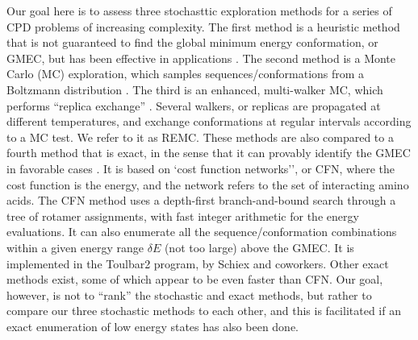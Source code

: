 Our goal here is to assess three stochasttic exploration methods for a series of CPD problems of increasing complexity.
The first method is a heuristic method that is not guaranteed to find the global minimum energy conformation, or GMEC,
but has been effective in applications \cite{Wernisch00,Schmidt09,Schmidt10}. The second method is a Monte Carlo (MC)
exploration, which samples sequences/conformations from a Boltzmann distribution \cite{Metropolis53,FrenkelBK,GrimmetBK}.
The third is an enhanced, multi-walker MC, which performs ``replica exchange'' \cite{Sugita99,Kofke02,Earl05}. Several
walkers, or replicas are propagated at different temperatures, and exchange conformations at regular intervals according
to a MC test. We refer to it as REMC. These methods are also compared to a fourth method that is exact, in the sense that
it can provably identify the GMEC in favorable cases \cite{Traore13,Allouche14}. It is based on `cost function networks'',
or CFN, where the cost function is the energy, and the network refers to the set of interacting amino acids. The CFN method
uses a depth-first branch-and-bound search through a tree of rotamer assignments, with fast integer arithmetic for the energy
evaluations. It can also enumerate all the sequence/conformation combinations within a given energy range $\delta E$ (not
too large) above the GMEC. It is implemented in the Toulbar2 program, by Schiex and coworkers. Other exact methods exist,
some of which appear to be even faster than CFN. Our goal, however, is not to ``rank'' the stochastic and exact methods,
but rather to compare our three stochastic methods to each other, and this is facilitated if an exact enumeration of 
low energy states has also been done.

